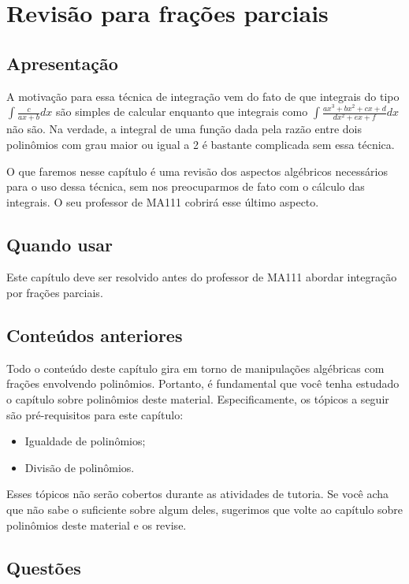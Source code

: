 \documentclass[main_estudante.tex]{subfiles}
\begin{document}
\chapter{Revisão para frações parciais}

\section{Apresentação}

A motivação para essa técnica de integração vem do fato de que integrais do tipo $\int \frac{c}{ax+b} dx$ são simples de calcular enquanto que integrais como $\int \frac{ax^3+bx^2+cx+d}{dx^2+ex+f} dx$ não são. Na verdade, a integral de uma função dada pela razão entre dois polinômios com grau maior ou igual a 2 é bastante complicada sem essa técnica.

O que faremos nesse capítulo é uma revisão dos aspectos algébricos necessários para o uso dessa técnica, sem nos preocuparmos de fato com o cálculo das integrais. O seu professor de MA111 cobrirá esse último aspecto.

\section{Quando usar}

Este capítulo deve ser resolvido antes do professor de MA111 abordar integração por frações parciais.

\section{Conteúdos anteriores}

Todo o conteúdo deste capítulo gira em torno de manipulações algébricas com frações envolvendo polinômios. Portanto, é fundamental que você tenha estudado o capítulo sobre polinômios deste material. Especificamente, os tópicos a seguir são pré-requisitos para este capítulo:
\begin{itemize}
 \item Igualdade de polinômios;
 \item Divisão de polinômios.
\end{itemize}

Esses tópicos não serão cobertos durante as atividades de tutoria. Se você acha que não sabe o suficiente sobre algum deles, sugerimos que volte ao capítulo sobre polinômios deste material e os revise.

\newpage

\section{Questões}
\end{document}
